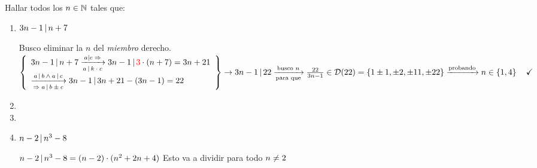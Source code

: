 \documentclass[12pt,a4paper, spanish]{article}
\begin{document}
\ejercicio
Hallar todos los $n \in \mathbb N$ tales que:
	\begin{enumerate}[label=\roman*)]
		\item $3n - 1 \, | \, n+7$\\
      \separadorCorto

      Busco eliminar la $n$ del \textit{miembro} derecho.\\
      $\llaves{l}{
        3n - 1 \divide n + 7
        \flecha{$a|c \entonces$}[$a \divide k\cdot c$]
        3n - 1 \divide \red{3} \cdot (n+7) = 3n + 21\\
        \flecha{$a \divide b \y a \divide c$}[$\entonces a \divide b \pm c$]
        3n-1 \divide 3n + 21 - (3n -1) = 22
      } \to 3n - 1 \divide 22\\
      \flecha{busco $n$}[para que] \frac{22}{3n-1} \en \divset{22}{1\pm1, \pm2, \pm11, \pm22} \flecha{probando} n \en \set{1,4} \Tilde$
    \item 
    \item

    \item $n-2 \, | \, n^3 - 8$

      \separadorCorto

      $n-2 \, | \, n^3 - 8 = (n-2) \cdot (n^2 + 2n + 4)$ Esto va a dividir para todo $n \neq 2$\\


	\end{enumerate}
\end{document}
